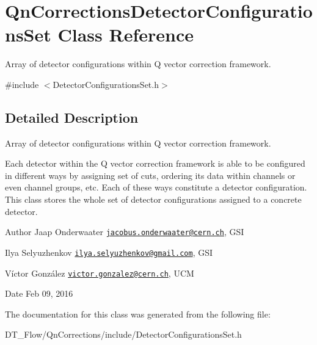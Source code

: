 \hypertarget{classQnCorrectionsDetectorConfigurationsSet}{}\section{Qn\+Corrections\+Detector\+Configurations\+Set Class Reference}
\label{classQnCorrectionsDetectorConfigurationsSet}


Array of detector configurations within Q vector correction framework.  




{\ttfamily \#include $<$Detector\+Configurations\+Set.\+h$>$}



\subsection{Detailed Description}
Array of detector configurations within Q vector correction framework. 

Each detector within the Q vector correction framework is able to be configured in different ways by assigning set of cuts, ordering its data within channels or even channel groups, etc. Each of these ways constitute a detector configuration. This class stores the whole set of detector configurations assigned to a concrete detector.

\begin{DoxyAuthor}{Author}
Jaap Onderwaater \href{mailto:jacobus.onderwaater@cern.ch}{\tt jacobus.\+onderwaater@cern.\+ch}, G\+SI 

Ilya Selyuzhenkov \href{mailto:ilya.selyuzhenkov@gmail.com}{\tt ilya.\+selyuzhenkov@gmail.\+com}, G\+SI 

Víctor González \href{mailto:victor.gonzalez@cern.ch}{\tt victor.\+gonzalez@cern.\+ch}, U\+CM 
\end{DoxyAuthor}
\begin{DoxyDate}{Date}
Feb 09, 2016 
\end{DoxyDate}


The documentation for this class was generated from the following file\+:\begin{DoxyCompactItemize}
\item 
D\+T\+\_\+\+Flow/\+Qn\+Corrections/include/Detector\+Configurations\+Set.\+h\end{DoxyCompactItemize}

